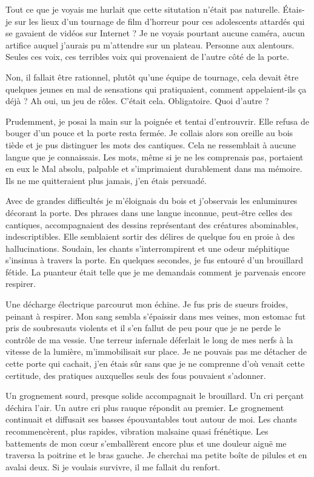 Tout ce que je voyais me hurlait que cette situtation n'était pas naturelle. Étais-je sur les lieux d'un tournage de 
film d'horreur pour ces adolescents attardés qui se gavaient de vidéos sur Internet ? Je ne voyais pourtant aucune 
caméra, aucun artifice auquel j'aurais pu m'attendre sur un plateau. Personne aux alentours. Seules ces voix, ces 
terribles voix qui provenaient de l'autre côté de la porte.

Non, il fallait être rationnel, plutôt qu'une équipe de tournage, cela devait être quelques jeunes en mal de sensations 
qui pratiquaient, comment appelaient-ils ça déjà ? Ah oui, un jeu de rôles. C'était cela. Obligatoire. Quoi d'autre ?

Prudemment, je posai la main sur la poignée et tentai d'entrouvrir. Elle refusa de bouger d'un pouce et la porte  
resta fermée. Je collais alors son oreille au bois tiède et je pus distinguer les mots des cantiques. Cela ne 
ressemblait à aucune langue que je connaissais. Les mots, même si je ne les comprenais pas, portaient en eux le Mal 
absolu, palpable et s'imprimaient durablement dans ma mémoire. Ils ne me quitteraient plus jamais, j'en étais persuadé.

Avec de grandes difficultés je m'éloignais du bois et j'observais les enluminures décorant la porte. Des phrases dans 
une langue inconnue, peut-être celles des cantiques, accompagnaient des dessins représentant des créatures abominables, 
indescriptibles. Elle semblaient sortir des délires de quelque fou en proie à des hallucinations. Soudain, les 
chants s'interrompirent et une odeur méphitique s'insinua à travers la porte. En quelques secondes, je fus entouré 
d'un brouillard fétide. La puanteur était telle que je me demandais comment je parvenais encore respirer.

Une décharge électrique parcourut mon échine. Je fus pris de sueurs froides, peinant à respirer. Mon sang sembla 
s'épaissir dans mes veines, mon estomac fut pris de soubresauts violents et il s'en fallut de peu pour que je ne perde 
le contrôle de ma vessie. Une terreur infernale déferlait le long de mes nerfs à la vitesse de la lumière, m'immobilisait 
sur place. Je ne pouvais pas me détacher de cette porte qui cachait, j'en étais sûr sans que je ne comprenne d'où venait 
cette certitude, des pratiques auxquelles seuls des fous pouvaient s'adonner.

Un grognement sourd, presque solide accompagnait le brouillard. Un cri perçant déchira l'air. Un autre cri plus rauque 
répondit au premier. Le grognement continuait et diffusait ses basses épouvantables tout autour de moi. Les chants 
recommencèrent, plus rapides, vibration malsaine quasi frénétique. Les battements de mon cœur s'emballèrent encore plus 
et une douleur aiguë me traversa la poitrine et le bras gauche. Je cherchai ma petite boîte de pilules et en 
avalai deux. Si je voulais survivre, il me fallait du renfort.

